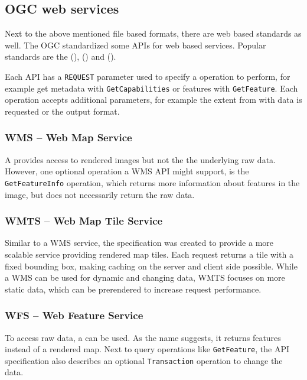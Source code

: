 	\subsection{OGC web services}
	
		Next to the above mentioned file based formats, there are web based standards as well.
		The OGC standardized some APIs for web based services.
		Popular standards are the  (),  () and  ().
		
		Each API has a \texttt{REQUEST} parameter used to specify a operation to perform, for example get metadata with \texttt{GetCapabilities} or features with \texttt{GetFeature}.
		Each operation accepts additional parameters, for example the extent from with data is requested or the output format.
		
		\subsubsection{WMS -- Web Map Service}
		
			A  provides access to rendered images but not the the underlying raw data.
			However, one optional operation a WMS API might support, is the \texttt{GetFeatureInfo} operation\cite[38]{ogc-wms}, which returns more information about features in the image, but does not necessarily return the raw data.
		
		\subsubsection{WMTS -- Web Map Tile Service}
		
			Similar to a WMS service, the  specification was created to provide a more scalable service providing rendered map tiles\cite[12]{ogc-wmts}.
			Each request returns a tile with a fixed bounding box, making caching on the server and client side possible.
			While a WMS can be used for dynamic and changing data, WMTS focuses on more static data, which can be prerendered to increase request performance\cite[13]{ogc-wmts}.
		
		\subsubsection{WFS -- Web Feature Service}
		
			To access raw data, a  can be used\cite{ogc-wfs}.
			As the name suggests, it returns features instead of a rendered map.
			Next to query operations like \texttt{GetFeature}, the API specification also describes an optional \texttt{Transaction} operation to change the data.
	

